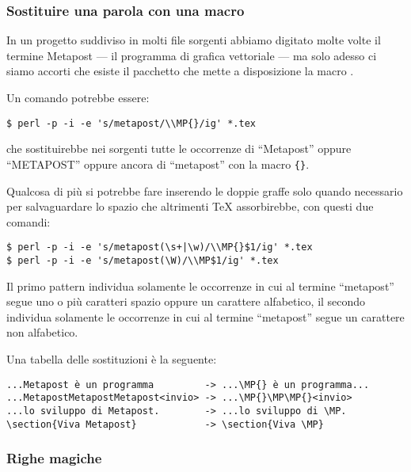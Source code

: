 \subsubsection{Sostituire una parola con una macro}

In un progetto suddiviso in molti file sorgenti abbiamo digitato molte volte il termine Metapost --- il programma di grafica vettoriale --- ma solo adesso ci siamo accorti che esiste il pacchetto  che mette a disposizione la macro .

Un comando potrebbe essere:
\begin{verbatim}
$ perl -p -i -e 's/metapost/\\MP{}/ig' *.tex
\end{verbatim}
che sostituirebbe nei sorgenti tutte le occorrenze di ``Metapost'' oppure ``METAPOST'' oppure ancora di ``metapost'' con la macro \texttt{\{\}}.

Qualcosa di più si potrebbe fare inserendo le doppie graffe solo quando necessario per salvaguardare lo spazio che altrimenti \TeX{} assorbirebbe, con questi due comandi:
\begin{verbatim}
$ perl -p -i -e 's/metapost(\s+|\w)/\\MP{}$1/ig' *.tex
$ perl -p -i -e 's/metapost(\W)/\\MP$1/ig' *.tex
\end{verbatim}

Il primo pattern individua solamente le occorrenze in cui al termine ``metapost'' segue uno o più caratteri spazio oppure un carattere alfabetico, il secondo individua solamente le occorrenze in cui al termine ``metapost'' segue un carattere non alfabetico.

Una tabella delle sostituzioni è la seguente:
\begin{Verbatim}[fontsize=\small]
...Metapost è un programma         -> ...\MP{} è un programma...
...MetapostMetapostMetapost<invio> -> ...\MP{}\MP\MP{}<invio>
...lo sviluppo di Metapost.        -> ...lo sviluppo di \MP.
\section{Viva Metapost}            -> \section{Viva \MP}
\end{Verbatim}

\subsubsection{Righe magiche}

